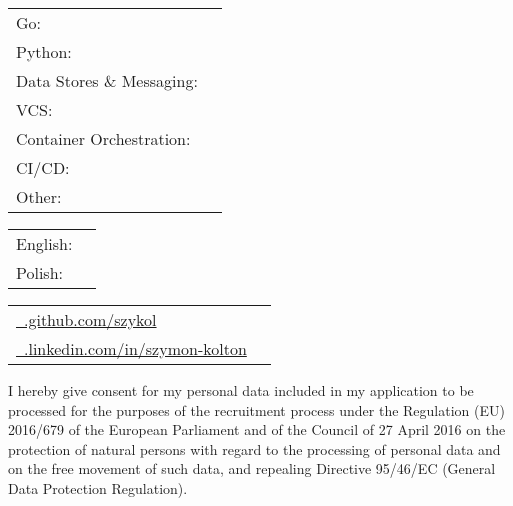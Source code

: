 \documentclass[]{awesome-cv}
\begin{document}
\vspace{-2mm}
\begin{cventries}
	\cventry
	{}
	{\def\arraystretch{1.15}{\begin{tabular}{ l l }
		Go: & {\skill{gomock, zap, dlv, freeconf, kafka-go, mongo-db-driver, msgpack, go-redis, go race}} \\
		Python:  & {\skill{ asyncio, fastapi, psycopg, asyncpg, aiohttp, flask, twisted, pytest }} \\
		Data Stores \& Messaging:  & {\skill{ postgresql, redis, mongodb, kafka }} \\
		VCS: & {\skill { git, github, gitlab, bitbucket, tfs }} \\
		Container Orchestration: & {\skill {kubernetes, helm, docker, docker-compose, docker-hub, k3s, harbor, k9s}} \\
		CI/CD: & {\skill {gitlab CI/CD, github actions, Jenkins}} \\
		Other: & {\skill {azure, jira, restconf, yang, gcp, rcp, scrum, hexagonal architecture, swagger, driver license}} \\
		\end{tabular}}}
	{}
	{}
	{}
\end{cventries}

\vspace{-7mm}

\pagebreak
{}
\begin{cventries}
	\cventry
	{}
	{\def\arraystretch{1.25}{\begin{tabular}{ l l }
		English:  & {\skill{ B2}} \\
		Polish:  & {\skill{ Native}} \\
		\end{tabular}}}
	{}
	{}
	{}
\end{cventries}
\vspace{-7mm}

\begin{cventries}
	\cventry
	{}
	{\def\arraystretch{1.25}{\begin{tabular}{ l l }
		\href{https://www.github.com/szykol}{\faGithubSquare\ \@www.github.com/szykol} \\
		\href{https://www.linkedin.com/in/szymon-kolton}{\faLinkedinSquare\ \@www.linkedin.com/in/szymon-kolton} \\
		\end{tabular}}}
	{}
	{}
	{}
\end{cventries}



\vspace{-5mm}
\begin{cventries}
	\cventry
	{}
	{}
	{}
	{}
	{I hereby give consent for my personal data included in my application to be processed for the purposes of the recruitment process under the Regulation (EU) 2016/679 of the European Parliament and of the Council of 27 April 2016 on the protection of natural persons with regard to the processing of personal data and on the free movement of such data, and repealing Directive 95/46/EC
	(General Data Protection Regulation).}
\end{cventries}
\end{document}
